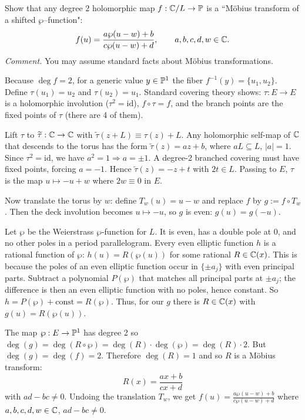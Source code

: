 \documentclass[12pt]{article}  %
\begin{document}
\begin{problem}[3 (from RS2)]
Show that any degree $2$ holomorphic map $f:\C/L \to \P$ is a “M{\"o}bius transform of a shifted $\wp$–function":
\[
  f(u) = \frac{a\wp(u-w)+b}{c\wp(u-w)+d}, \qquad a,b,c,d,w \in \C.
\]
\emph{Comment.} You may assume standard facts about M{\"o}bius transformations.
\end{problem}

\begin{solution}
  Because $\deg f=2$, for a generic value $y\in\P^1$ the fiber $f^{-1}(y)=\{u_1,u_2\}$. Define $\tau(u_1)=u_2$ and $\tau(u_2)=u_1$. Standard covering theory shows: $\tau:E\to E$ is a holomorphic involution ($\tau^2=\mathrm{id}$), $f\circ\tau=f$, and the branch points are the fixed points of $\tau$ (there are 4 of them).

  Lift $\tau$ to $\widetilde\tau:\C\to\C$ with $\widetilde\tau(z+L)\equiv\tau(z)+L$. Any holomorphic self-map of $\C$ that descends to the torus has the form $\widetilde\tau(z)=az+b$, where $aL\subseteq L$, $|a|=1$. Since $\tau^2=\mathrm{id}$, we have $a^2=1\Rightarrow a=\pm1$. A degree-2 branched covering must have fixed points, forcing $a=-1$. Hence $\widetilde\tau(z)=-z+t$ with $2t\in L$. Passing to $E$, $\tau$ is the map $u\mapsto -u+w$ where $2w\equiv0$ in $E$.

  Now translate the torus by $w$: define $T_w(u)=u-w$ and replace $f$ by $g:=f\circ T_w$. Then the deck involution becomes $u\mapsto -u$, so $g$ is even: $g(u)=g(-u)$.

  Let $\wp$ be the Weierstrass $\wp$-function for $L$. It is even, has a double pole at 0, and no other poles in a period parallelogram. Every even elliptic function $h$ is a rational function of $\wp$: $h(u)=R(\wp(u))$ for some rational $R\in\C(x)$. This is because the poles of an even elliptic function occur in $\{\pm a_j\}$ with even principal parts. Subtract a polynomial $P(\wp)$ that matches all principal parts at $\pm a_j$; the difference is then an even elliptic function with no poles, hence constant. So $h=P(\wp)+\text{const}=R(\wp)$. Thus, for our $g$ there is $R\in\C(x)$ with $g(u)=R(\wp(u))$.

  The map $\wp:E\to\P^1$ has degree 2 so $\deg(g)=\deg(R\circ\wp)=\deg(R)\cdot \deg(\wp)=\deg(R)\cdot 2$. But $\deg(g)=\deg(f)=2$. Therefore $\deg(R)=1$ and so $R$ is a Möbius transform: \[R(x)=\frac{ax+b}{cx+d}\] with $ad-bc\neq0$. Undoing the translation $T_w$, we get $f(u)=\frac{a\wp(u-w)+b}{c\wp(u-w)+d}$ where $a,b,c,d,w\in\C$, $ad-bc\neq0$.
\end{solution}
\end{document}
